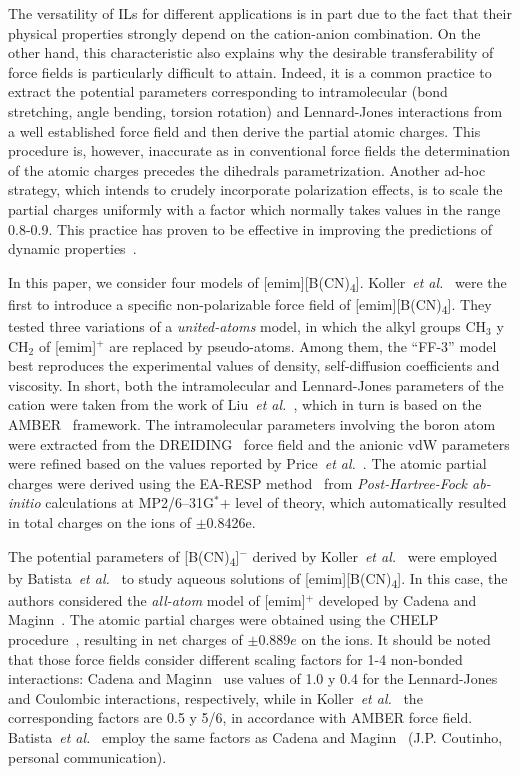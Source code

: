 \documentclass[3p,twocolumn]{elsarticle}
\begin{document}
The versatility of ILs for different applications is in part due to the fact that their physical properties strongly depend on the cation-anion combination. On the other hand, this characteristic also explains why the desirable transferability of force fields is particularly difficult to attain. Indeed, it is a common practice to extract the potential parameters corresponding to intramolecular (bond stretching, angle bending, torsion rotation) and Lennard-Jones interactions from a well established force field and then derive the partial atomic charges. This procedure is, however, inaccurate as in conventional force fields the determination of the atomic charges precedes the dihedrals parametrization. Another ad-hoc strategy, which intends to crudely incorporate polarization effects, is to scale the partial charges uniformly with a factor which normally takes values in the range 0.8-0.9. This practice has proven to be effective in improving the predictions of dynamic properties~\cite{Schr_der_2012}.

In this paper, we consider four models of [emim][B(CN)\textsubscript{4}]. Koller~\textit{et al.}~\cite{Koller_2012} were the first to introduce a specific non-polarizable force field of [emim][B(CN)\textsubscript{4}]. They tested three variations of a \textit{united-atoms} model, in which the alkyl groups $\text{CH}_3$ y $\text{CH}_2$ of [emim]$^{+}$ are replaced by pseudo-atoms. Among them, the ``FF-3'' model best reproduces the experimental values of density, self-diffusion coefficients and viscosity. In short, both the intramolecular and Lennard-Jones parameters of the cation were taken from the work of Liu~\textit{et al.}~\cite{Liu_2006}, which in turn is based on the AMBER~\cite{Cornell_1995} framework. The intramolecular parameters involving the boron atom were extracted from the DREIDING~\cite{Mayo_1990} force field and the anionic vdW parameters were refined based on the values reported by Price~\textit{et al.}~\cite{Price_2001}. The atomic partial charges were derived using the EA-RESP method~\cite{Basma_2001} from \textit{Post-Hartree-Fock ab-initio} calculations at MP2/6–31G$^\ast$+ level of theory, which automatically resulted in total charges on the ions of $\pm$0.8426e. 

The potential parameters of [B(CN)\textsubscript{4}]$^{-}$ derived by Koller~\textit{et al.}~\cite{Koller_2012} were employed by Batista~\textit{et al.}~\cite{Batista_2015} to study aqueous solutions of [emim][B(CN)\textsubscript{4}]. In this case,  the authors considered the \textit{all-atom} model of [emim]$^{+}$ developed by Cadena and Maginn~\cite{Cadena_2006}. The atomic partial charges were obtained using the CHELP procedure~\cite{Breneman_1990}, resulting in net charges of $\pm$0.889$e$ on the ions. It should be noted that those force fields consider different scaling factors for 1-4 non-bonded interactions: Cadena and Maginn~\cite{Cadena_2006} use values of 1.0 y 0.4 for the Lennard-Jones and Coulombic interactions, respectively, while in Koller~\textit{et al.}~\cite{Koller_2012} the corresponding factors are 0.5 y 5/6, in accordance with AMBER force field. Batista~\textit{et al.}~\cite{Batista_2015} employ the same factors as Cadena and Maginn~\cite{Cadena_2006} (J.P. Coutinho, personal communication).
\end{document}
